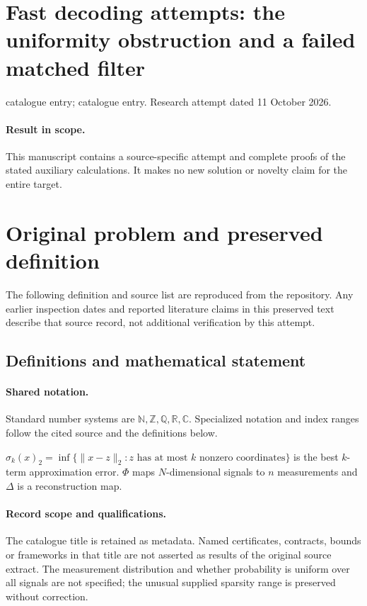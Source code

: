 \documentclass[11pt]{article}
\begin{document}
\section*{Fast decoding attempts: the uniformity obstruction and a failed matched filter}
\noindent catalogue entry; catalogue entry. Research attempt dated 11 October 2026.
\paragraph{Result in scope.}This manuscript contains a source-specific attempt and complete proofs of the stated auxiliary calculations. It makes no new solution or novelty claim for the entire target.
\section{Original problem and preserved definition}
The following definition and source list are reproduced from the repository. Any earlier inspection dates and reported literature claims in this preserved text describe that source record, not additional verification by this attempt.
\subsection{Definitions and mathematical statement}

\paragraph{Shared notation.}Standard number systems are $\mathbb N,\mathbb Z,\mathbb Q,\mathbb R,\mathbb C$. Specialized notation and index ranges follow the cited source and the definitions below.


$\sigma_k(x)_2=\inf\{\lVert x-z\rVert_2:z\text{ has at most }k\text{ nonzero coordinates}\}$ is the best $k$-term approximation error. $\Phi$ maps $N$-dimensional signals to $n$ measurements and $\Delta$ is a reconstruction map.
\paragraph{Record scope and qualifications.}
The catalogue title is retained as metadata. Named certificates, contracts, bounds or frameworks in that title are not asserted as results of the original source extract.
The measurement distribution and whether probability is uniform over all signals are not specified; the unusual supplied sparsity range is preserved without correction.
\end{document}
